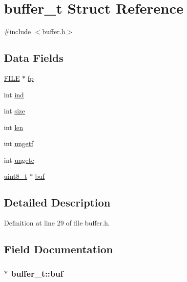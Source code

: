 \hypertarget{structbuffer__t}{}\section{buffer\+\_\+t Struct Reference}
\label{structbuffer__t}


{\ttfamily \#include $<$buffer.\+h$>$}

\subsection*{Data Fields}
\begin{DoxyCompactItemize}
\item 
\hyperlink{posix_8h_aed4dabeb9f7c518ded42f930a04abce8}{F\+I\+LE} $\ast$ \hyperlink{structbuffer__t_a00a55014e0827223c41b1b1d56e5be5d}{fp}
\item 
int \hyperlink{structbuffer__t_a59ea992e5006ead050862bae5c41670a}{ind}
\item 
int \hyperlink{structbuffer__t_a34e81d898c6accf4f06ed9c1133d6361}{size}
\item 
int \hyperlink{structbuffer__t_a0b67fc6880d331ae05dab0e58a4584c2}{len}
\item 
int \hyperlink{structbuffer__t_a67c2edddeca1858c670ff57e049a9e0e}{ungetf}
\item 
int \hyperlink{structbuffer__t_aa1fbbf42ce5d6278b21a93647bef3ff1}{ungetc}
\item 
\hyperlink{send_8c_aba7bc1797add20fe3efdf37ced1182c5}{uint8\+\_\+t} $\ast$ \hyperlink{structbuffer__t_ab98e4f2d4fe10a680089d291ef1907c7}{buf}
\end{DoxyCompactItemize}


\subsection{Detailed Description}


Definition at line 29 of file buffer.\+h.



\subsection{Field Documentation}
\subsubsection[{\texorpdfstring{buf}{buf}}]{$\ast$ buffer\+\_\+t\+::buf}\hypertarget{structbuffer__t_ab98e4f2d4fe10a680089d291ef1907c7}{}\label{structbuffer__t_ab98e4f2d4fe10a680089d291ef1907c7}


